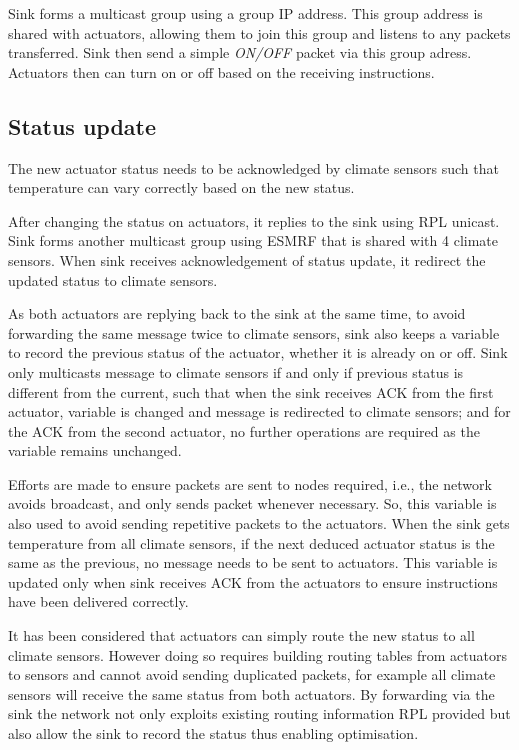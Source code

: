 \documentclass[12pt, oneside, a4paper]{article}
\begin{document}
    Sink forms a multicast group using a group IP address. This group address is shared with actuators, allowing them to join this group and listens to any packets transferred. Sink then send a simple \textit{ON/OFF} packet via this group adress. Actuators then can turn on or off based on the receiving instructions.

    \subsection{Status update}

    The new actuator status needs to be acknowledged by climate sensors such that temperature can vary correctly based on the new status.

    After changing the status on actuators, it replies to the sink using RPL unicast. Sink forms another multicast group using ESMRF that is shared with 4 climate sensors. When sink receives acknowledgement of status update, it redirect the updated status to climate sensors.

    As both actuators are replying back to the sink at the same time, to avoid forwarding the same message twice to climate sensors, sink also keeps a variable to record the previous status of the actuator, whether it is already on or off. Sink only multicasts message to climate sensors if and only if previous status is different from the current, such that when the sink receives ACK from the first actuator, variable is changed and message is redirected to climate sensors; and for the ACK from the second actuator, no further operations are required as the variable remains unchanged.

    Efforts are made to ensure packets are sent to nodes required, i.e., the network avoids broadcast, and only sends packet whenever necessary. So, this variable is also used to avoid sending repetitive packets to the actuators. When the sink gets temperature from all climate sensors, if the next deduced actuator status is the same as the previous, no message needs to be sent to actuators. This variable is updated only when sink receives ACK from the actuators to ensure instructions have been delivered correctly.

    It has been considered that actuators can simply route the new status to all climate sensors. However doing so requires building routing tables from actuators to sensors and cannot avoid sending duplicated packets, for example all climate sensors will receive the same status from both actuators. By forwarding via the sink the network not only exploits existing routing information RPL provided but also allow the sink to record the status thus enabling optimisation.
\end{document}
